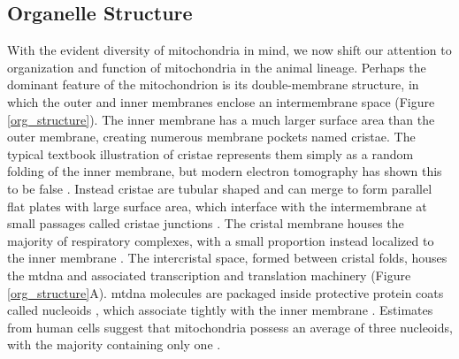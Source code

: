 \documentclass[12pt,twoside]{reedthesis}
\begin{document}
\subsection{Organelle Structure}
With the evident diversity of mitochondria in mind, we now shift our attention to organization and function of mitochondria in the animal lineage.
Perhaps the dominant feature of the mitochondrion is its double-membrane structure, in which the outer and inner membranes enclose an intermembrane space (Figure \ref{org_structure}).
The inner membrane has a much larger surface area than the outer membrane, creating numerous membrane pockets named cristae.
The typical textbook illustration of cristae represents them simply as a random folding of the inner membrane, but modern electron tomography has shown this to be false \citep{perkins_electron_1997, mannella_structure_2006}.
Instead cristae are tubular shaped and can merge to form parallel flat plates with large surface area, which interface with the intermembrane at small passages called cristae junctions \citep{perkins_electron_1997, perkins_recent_2000}. 
The cristal membrane houses the majority of respiratory complexes, with a small proportion instead localized to the inner membrane \citep{gilkerson_cristal_2003, logan_mitochondrial_2006}.
The intercristal space, formed between cristal folds, houses the \gls{mtdna} and associated transcription and translation machinery (Figure \ref{org_structure}A). %
\gls{mtdna} molecules are packaged inside protective protein coats called nucleoids \citep{bogenhagen_mitochondrial_2012}, which associate tightly with the inner membrane \citep{brown_superresolution_2011}.
Estimates from human cells suggest that mitochondria possess an average of three nucleoids, with the majority containing only one \citep{satoh_organization_1991}.
\end{document}
